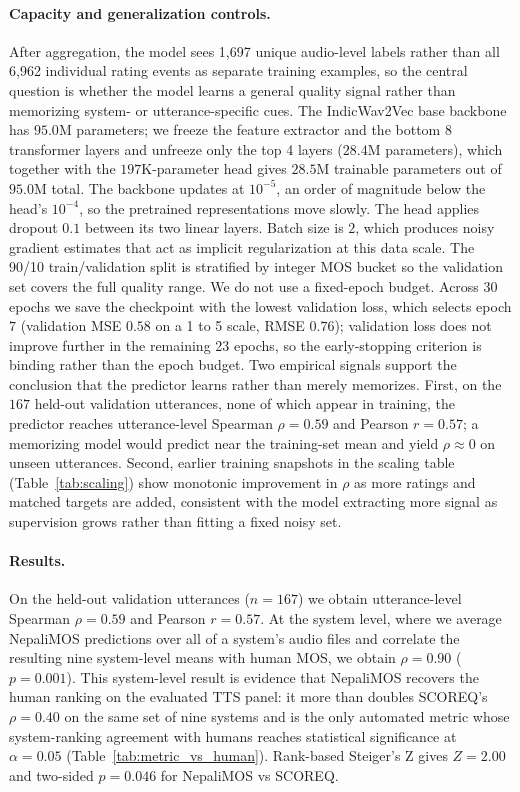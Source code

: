 \documentclass[11pt]{article}
\begin{document}
\paragraph{Capacity and generalization controls.} After aggregation, the model sees 1{,}697 unique audio-level labels rather than all 6{,}962 individual rating events as separate training examples, so the central question is whether the model learns a general quality signal rather than memorizing system- or utterance-specific cues. The IndicWav2Vec base backbone has $95.0$M parameters; we freeze the feature extractor and the bottom 8 transformer layers and unfreeze only the top 4 layers ($28.4$M parameters), which together with the $197$K-parameter head gives $28.5$M trainable parameters out of $95.0$M total. The backbone updates at $10^{-5}$, an order of magnitude below the head's $10^{-4}$, so the pretrained representations move slowly. The head applies dropout $0.1$ between its two linear layers. Batch size is $2$, which produces noisy gradient estimates that act as implicit regularization at this data scale. The 90/10 train/validation split is stratified by integer MOS bucket so the validation set covers the full quality range. We do not use a fixed-epoch budget. Across 30 epochs we save the checkpoint with the lowest validation loss, which selects epoch $7$ (validation MSE $0.58$ on a 1 to 5 scale, RMSE $0.76$); validation loss does not improve further in the remaining 23 epochs, so the early-stopping criterion is binding rather than the epoch budget. Two empirical signals support the conclusion that the predictor learns rather than merely memorizes. First, on the $167$ held-out validation utterances, none of which appear in training, the predictor reaches utterance-level Spearman $\rho = 0.59$ and Pearson $r = 0.57$; a memorizing model would predict near the training-set mean and yield $\rho \approx 0$ on unseen utterances. Second, earlier training snapshots in the scaling table (Table~\ref{tab:scaling}) show monotonic improvement in $\rho$ as more ratings and matched targets are added, consistent with the model extracting more signal as supervision grows rather than fitting a fixed noisy set.

\paragraph{Results.} On the held-out validation utterances ($n = 167$) we obtain utterance-level Spearman $\rho = 0.59$ and Pearson $r = 0.57$. At the system level, where we average NepaliMOS predictions over all of a system's audio files and correlate the resulting nine system-level means with human MOS, we obtain $\rho = 0.90$ ($p = 0.001$). This system-level result is evidence that NepaliMOS recovers the human ranking on the evaluated TTS panel: it more than doubles SCOREQ's $\rho = 0.40$ on the same set of nine systems and is the only automated metric whose system-ranking agreement with humans reaches statistical significance at $\alpha = 0.05$ (Table~\ref{tab:metric_vs_human}). Rank-based Steiger's Z gives $Z=2.00$ and two-sided $p=0.046$ for NepaliMOS vs SCOREQ.
\end{document}
